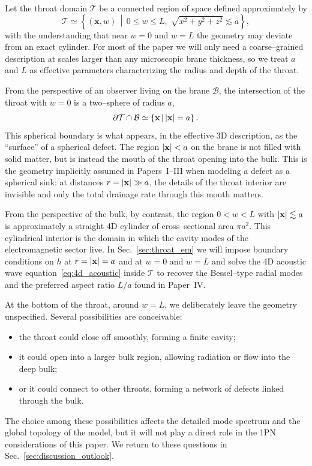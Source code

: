 \documentclass[12pt]{article}
\begin{document}
Let the throat domain $\mathcal{T}$ be a connected region of space defined
approximately by
\begin{equation}
  \mathcal{T}
  \simeq \left\{
    (\mathbf{x},w)\,\middle|\,
    0 \le w \le L,\;
    \sqrt{x^2 + y^2 + z^2} \lesssim a
  \right\},
  \label{eq:throat_domain}
\end{equation}
with the understanding that near $w=0$ and $w=L$ the geometry may deviate
from an exact cylinder.  For most of the paper we will only need a
coarse--grained description at scales larger than any microscopic brane
thickness, so we treat $a$ and $L$ as effective parameters characterizing
the radius and depth of the throat.

From the perspective of an observer living on the brane $\mathcal{B}$, the
intersection of the throat with $w=0$ is a two--sphere of radius $a$,
\begin{equation}
  \partial\mathcal{T}\cap\mathcal{B}
  \simeq \left\{
    \mathbf{x}\,\middle|\,
    \abs{\mathbf{x}} = a
  \right\}.
\end{equation}
This spherical boundary is what appears, in the effective 3D description, as
the ``surface'' of a spherical defect.  The region $\abs{\mathbf{x}}<a$ on
the brane is not filled with solid matter, but is instead the mouth of the
throat opening into the bulk.  This is the geometry implicitly assumed in
Papers~I--III when modeling a defect as a spherical sink: at distances
$r=\abs{\mathbf{x}}\gg a$, the details of the throat interior are invisible
and only the total drainage rate through this mouth matters.

From the perspective of the bulk, by contrast, the region
$0 < w < L$ with $\abs{\mathbf{x}}\lesssim a$ is approximately a straight
4D cylinder of cross--sectional area $\pi a^2$.  This cylindrical interior
is the domain in which the cavity modes of the electromagnetic sector live.
In Sec.~\ref{sec:throat_em} we will impose boundary conditions on $h$ at
$r=\abs{\mathbf{x}}=a$ and at $w=0$ and $w=L$ and solve the 4D acoustic wave
equation~\eqref{eq:4d_acoustic} inside $\mathcal{T}$ to recover the
Bessel--type radial modes and the preferred aspect ratio $L/a$ found in
Paper~IV.

At the bottom of the throat, around $w=L$, we deliberately leave the
geometry unspecified.  Several possibilities are conceivable:
\begin{itemize}
  \item the throat could close off smoothly, forming a finite cavity;
  \item it could open into a larger bulk region, allowing radiation or
    flow into the deep bulk;
  \item or it could connect to other throats, forming a network of
    defects linked through the bulk.
\end{itemize}
The choice among these possibilities affects the detailed mode spectrum and
the global topology of the model, but it will not play a direct role in the
1PN considerations of this paper.  We return to these questions in
Sec.~\ref{sec:discussion_outlook}.
\end{document}
